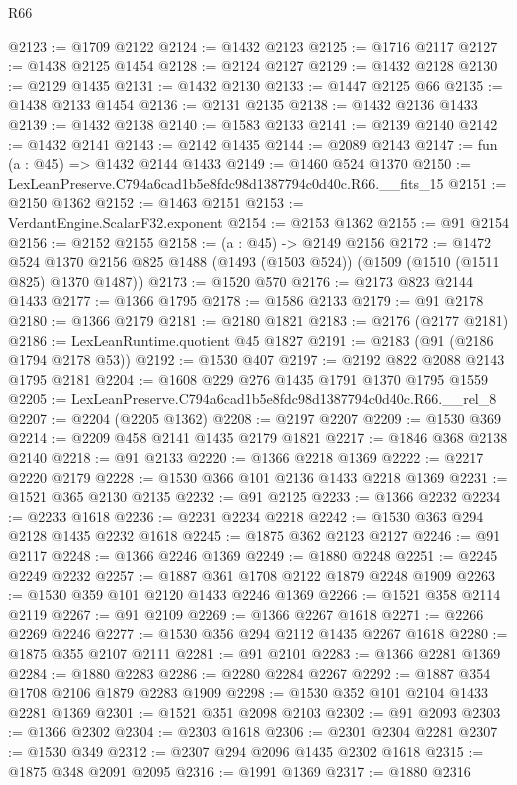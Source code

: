 \begin{lexlean}{R66}
\begin{coremodule}
@2123 := @1709 @2122
@2124 := @1432 @2123
@2125 := @1716 @2117
@2127 := @1438 @2125 @1454
@2128 := @2124 @2127
@2129 := @1432 @2128
@2130 := @2129 @1435
@2131 := @1432 @2130
@2133 := @1447 @2125 @66
@2135 := @1438 @2133 @1454
@2136 := @2131 @2135
@2138 := @1432 @2136 @1433
@2139 := @1432 @2138
@2140 := @1583 @2133
@2141 := @2139 @2140
@2142 := @1432 @2141
@2143 := @2142 @1435
@2144 := @2089 @2143
@2147 := fun (a : @45) => @1432 @2144 @1433
@2149 := @1460 @524 @1370
@2150 := LexLeanPreserve.C794a6cad1b5e8fdc98d1387794c0d40c.R66.__fits_15
@2151 := @2150 @1362
@2152 := @1463 @2151
@2153 := VerdantEngine.ScalarF32.exponent
@2154 := @2153 @1362
@2155 := @91 @2154
@2156 := @2152 @2155
@2158 := (a : @45) -> @2149 @2156
@2172 := @1472
    @524
    @1370
    @2156
    @825
    @1488
    (@1493 (@1503 @524))
    (@1509 (@1510 (@1511 @825) @1370 @1487))
@2173 := @1520 @570
@2176 := @2173 @823 @2144 @1433
@2177 := @1366 @1795
@2178 := @1586 @2133
@2179 := @91 @2178
@2180 := @1366 @2179
@2181 := @2180 @1821
@2183 := @2176 (@2177 @2181)
@2186 := LexLeanRuntime.quotient @45 @1827
@2191 := @2183 (@91 (@2186 @1794 @2178 @53))
@2192 := @1530 @407
@2197 := @2192 @822 @2088 @2143 @1795 @2181
@2204 := @1608 @229 @276 @1435 @1791 @1370 @1795 @1559
@2205 := LexLeanPreserve.C794a6cad1b5e8fdc98d1387794c0d40c.R66.__rel_8
@2207 := @2204 (@2205 @1362)
@2208 := @2197 @2207
@2209 := @1530 @369
@2214 := @2209 @458 @2141 @1435 @2179 @1821
@2217 := @1846 @368 @2138 @2140
@2218 := @91 @2133
@2220 := @1366 @2218 @1369
@2222 := @2217 @2220 @2179
@2228 := @1530 @366 @101 @2136 @1433 @2218 @1369
@2231 := @1521 @365 @2130 @2135
@2232 := @91 @2125
@2233 := @1366 @2232
@2234 := @2233 @1618
@2236 := @2231 @2234 @2218
@2242 := @1530 @363 @294 @2128 @1435 @2232 @1618
@2245 := @1875 @362 @2123 @2127
@2246 := @91 @2117
@2248 := @1366 @2246 @1369
@2249 := @1880 @2248
@2251 := @2245 @2249 @2232
@2257 := @1887 @361 @1708 @2122 @1879 @2248 @1909
@2263 := @1530 @359 @101 @2120 @1433 @2246 @1369
@2266 := @1521 @358 @2114 @2119
@2267 := @91 @2109
@2269 := @1366 @2267 @1618
@2271 := @2266 @2269 @2246
@2277 := @1530 @356 @294 @2112 @1435 @2267 @1618
@2280 := @1875 @355 @2107 @2111
@2281 := @91 @2101
@2283 := @1366 @2281 @1369
@2284 := @1880 @2283
@2286 := @2280 @2284 @2267
@2292 := @1887 @354 @1708 @2106 @1879 @2283 @1909
@2298 := @1530 @352 @101 @2104 @1433 @2281 @1369
@2301 := @1521 @351 @2098 @2103
@2302 := @91 @2093
@2303 := @1366 @2302
@2304 := @2303 @1618
@2306 := @2301 @2304 @2281
@2307 := @1530 @349
@2312 := @2307 @294 @2096 @1435 @2302 @1618
@2315 := @1875 @348 @2091 @2095
@2316 := @1991 @1369
@2317 := @1880 @2316

\end{coremodule}
\end{lexlean}

